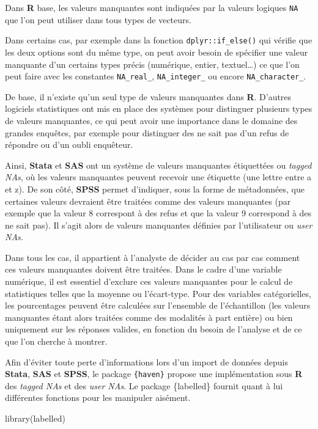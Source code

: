 \documentclass[
  letterpaper,
  DIV=11,
  numbers=noendperiod,
  oneside]{scrreprt}
\newenvironment{Shaded}{\begin{snugshade}}{\end{snugshade}}
\newcommand{\FunctionTok}[1]{\textcolor[rgb]{0.28,0.35,0.67}{#1}}
\newcommand{\NormalTok}[1]{\textcolor[rgb]{0.00,0.23,0.31}{#1}}
\begin{document}
Dans \textbf{R} base, les valeurs manquantes sont indiquées par la
valeurs logiques \texttt{NA} que l'on peut utiliser dans tous types de
vecteurs.

Dans certains cas, par exemple dans la fonction
\texttt{dplyr::if\_else()} qui vérifie que les deux options sont du même
type, on peut avoir besoin de spécifier une valeur manquante d'un
certains types précis (numérique, entier, textuel\ldots) ce que l'on
peut faire avec les constantes \texttt{NA\_real\_},
\texttt{NA\_integer\_} ou encore \texttt{NA\_character\_}.

De base, il n'existe qu'un seul type de valeurs manquantes dans
\textbf{R}. D'autres logiciels statistiques ont mis en place des
systèmes pour distinguer plusieurs types de valeurs manquantes, ce qui
peut avoir une importance dans le domaine des grandes enquêtes, par
exemple pour distinguer des ne sait pas d'un refus de répondre ou d'un
oubli enquêteur.

Ainsi, \textbf{Stata} et \textbf{SAS} ont un système de valeurs
manquantes étiquettées ou \emph{tagged NAs}, où les valeurs manquantes
peuvent recevoir une étiquette (une lettre entre a et z). De son côté,
\textbf{SPSS} permet d'indiquer, sous la forme de métadonnées, que
certaines valeurs devraient être traitées comme des valeurs manquantes
(par exemple que la valeur 8 correspont à des refus et que la valeur 9
correspond à des ne sait pas). Il s'agit alors de valeurs manquantes
définies par l'utilisateur ou \emph{user NAs.}

Dans tous les cas, il appartient à l'analyste de décider au cas par cas
comment ces valeurs manquantes doivent être traitées. Dans le cadre
d'une variable numérique, il est essentiel d'exclure ces valeurs
manquantes pour le calcul de statistiques telles que la moyenne ou
l'écart-type. Pour des variables catégorielles, les pourcentages peuvent
être calculées sur l'ensemble de l'échantillon (les valeurs manquantes
étant alors traitées comme des modalités à part entière) ou bien
uniquement sur les réponses valides, en fonction du besoin de l'analyse
et de ce que l'on cherche à montrer.

Afin d'éviter toute perte d'informations lors d'un import de données
depuis \textbf{Stata}, \textbf{SAS} et \textbf{SPSS}, le package
\texttt{\{haven\}} propose une implémentation sous \textbf{R} des
\emph{tagged NAs} et des \emph{user NAs}. Le package \{labelled\}
fournit quant à lui différentes fonctions pour les manipuler aisément.

\begin{Shaded}
\begin{Highlighting}[]
\FunctionTok{library}\NormalTok{(labelled)}
\end{Highlighting}
\end{Shaded}
\end{document}
